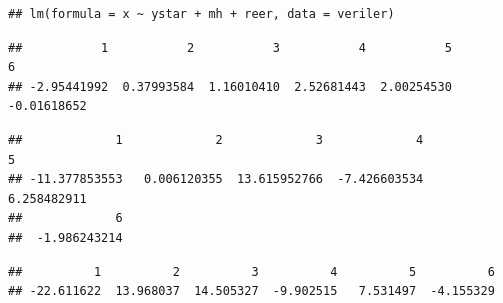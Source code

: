 \documentclass[]{article}
\newenvironment{Shaded}{\begin{snugshade}}{\end{snugshade}}
\newcommand{\KeywordTok}[1]{\textcolor[rgb]{0.13,0.29,0.53}{\textbf{#1}}}
\newcommand{\StringTok}[1]{\textcolor[rgb]{0.31,0.60,0.02}{#1}}
\newcommand{\OperatorTok}[1]{\textcolor[rgb]{0.81,0.36,0.00}{\textbf{#1}}}
\newcommand{\NormalTok}[1]{#1}
\begin{document}
\begin{verbatim}
## lm(formula = x ~ ystar + mh + reer, data = veriler)
\end{verbatim}

\begin{Shaded}
\end{Shaded}

\begin{verbatim}
##           1           2           3           4           5           6 
## -2.95441992  0.37993584  1.16010410  2.52681443  2.00254530 -0.01618652
\end{verbatim}

\begin{Shaded}
\end{Shaded}

\begin{verbatim}
##             1             2             3             4             5 
## -11.377853553   0.006120355  13.615952766  -7.426603534   6.258482911 
##             6 
##  -1.986243214
\end{verbatim}

\begin{Shaded}
\end{Shaded}

\begin{verbatim}
##          1          2          3          4          5          6 
## -22.611622  13.968037  14.505327  -9.902515   7.531497  -4.155329
\end{verbatim}

\begin{Shaded}
\end{Shaded}
\end{document}
